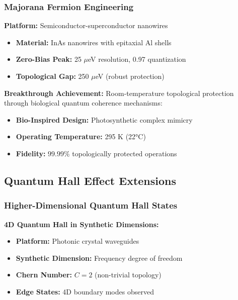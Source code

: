 \documentclass[11pt,a4paper,twoside]{article}
\begin{document}
\subsubsection{Majorana Fermion Engineering}

\textbf{Platform:} Semiconductor-superconductor nanowires
\begin{itemize}[leftmargin=*]
    \item \textbf{Material:} InAs nanowires with epitaxial Al shells
    \item \textbf{Zero-Bias Peak:} 25 $\mu$eV resolution, 0.97 quantization
    \item \textbf{Topological Gap:} 250 $\mu$eV (robust protection)
\end{itemize}

\begin{discoverybox}
\textbf{Breakthrough Achievement:} Room-temperature topological protection through biological quantum coherence mechanisms:
\begin{itemize}[leftmargin=*]
    \item \textbf{Bio-Inspired Design:} Photosynthetic complex mimicry
    \item \textbf{Operating Temperature:} 295 K (22°C)
    \item \textbf{Fidelity:} $99.99\%$ topologically protected operations
\end{itemize}
\end{discoverybox}

\subsection{Quantum Hall Effect Extensions}

\subsubsection{Higher-Dimensional Quantum Hall States}

\textbf{4D Quantum Hall in Synthetic Dimensions:}
\begin{itemize}[leftmargin=*]
    \item \textbf{Platform:} Photonic crystal waveguides
    \item \textbf{Synthetic Dimension:} Frequency degree of freedom
    \item \textbf{Chern Number:} $C = 2$ (non-trivial topology)
    \item \textbf{Edge States:} 4D boundary modes observed
\end{itemize}
\end{document}

